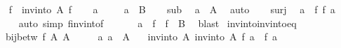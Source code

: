 \begin{isabellebody}
\ \ \isamarkupfalse%
\ {\isacharquery}{\kern0pt}f{\isacharprime}{\kern0pt}\ {\isacharequal}{\kern0pt}\ {\isachardoublequoteopen}inv{\isacharunderscore}{\kern0pt}into\ A\ f{\isachardoublequoteclose}\isanewline
\ \ \isamarkupfalse%
\ a{\isacharprime}{\kern0pt}\isanewline
\ \ \isamarkupfalse%
\ {\isacharasterisk}{\kern0pt}{\isacharcolon}{\kern0pt}\ {\isachardoublequoteopen}a{\isacharprime}{\kern0pt}\ {\isasymin}\ B{\isacharprime}{\kern0pt}{\isachardoublequoteclose}\isanewline
\ \ \isamarkupfalse%
\ sub\ \isamarkupfalse%
\ {\isachardoublequoteopen}a{\isacharprime}{\kern0pt}\ {\isasymin}\ A{\isacharprime}{\kern0pt}{\isachardoublequoteclose}\ \isamarkupfalse%
\ auto\isanewline
\ \ \isamarkupfalse%
\ surj\ \isamarkupfalse%
\ {\isachardoublequoteopen}a{\isacharprime}{\kern0pt}\ {\isacharequal}{\kern0pt}\ f\ {\isacharparenleft}{\kern0pt}{\isacharquery}{\kern0pt}f{\isacharprime}{\kern0pt}\ a{\isacharprime}{\kern0pt}{\isacharparenright}{\kern0pt}{\isachardoublequoteclose}\isanewline
\ \ \ \ \isamarkupfalse%
\ {\isacharparenleft}{\kern0pt}auto\ simp{\isacharcolon}{\kern0pt}\ f{\isacharunderscore}{\kern0pt}inv{\isacharunderscore}{\kern0pt}into{\isacharunderscore}{\kern0pt}f{\isacharparenright}{\kern0pt}\isanewline
\ \ \isamarkupfalse%
\ {\isacharasterisk}{\kern0pt}\ \isamarkupfalse%
\ {\isachardoublequoteopen}a{\isacharprime}{\kern0pt}\ {\isasymin}\ f\ {\isacharbackquote}{\kern0pt}\ {\isacharparenleft}{\kern0pt}{\isacharquery}{\kern0pt}f{\isacharprime}{\kern0pt}\ {\isacharbackquote}{\kern0pt}\ B{\isacharprime}{\kern0pt}{\isacharparenright}{\kern0pt}{\isachardoublequoteclose}\ \isamarkupfalse%
\ blast\isanewline
{}\isamarkupfalse%
%
\endisatagproof
{\isafoldproof}%
%
\isadelimproof
\isanewline
%
\endisadelimproof
\isanewline
{}\isamarkupfalse%
\ inv{\isacharunderscore}{\kern0pt}into{\isacharunderscore}{\kern0pt}inv{\isacharunderscore}{\kern0pt}into{\isacharunderscore}{\kern0pt}eq{\isacharcolon}{\kern0pt}\isanewline
\ \ \ {\isachardoublequoteopen}bij{\isacharunderscore}{\kern0pt}betw\ f\ A\ A{\isacharprime}{\kern0pt}{\isachardoublequoteclose}\isanewline
\ \ \ \ \ a{\isacharcolon}{\kern0pt}\ {\isachardoublequoteopen}a\ {\isasymin}\ A{\isachardoublequoteclose}\isanewline
\ \ \ {\isachardoublequoteopen}inv{\isacharunderscore}{\kern0pt}into\ A{\isacharprime}{\kern0pt}\ {\isacharparenleft}{\kern0pt}inv{\isacharunderscore}{\kern0pt}into\ A\ f{\isacharparenright}{\kern0pt}\ a\ {\isacharequal}{\kern0pt}\ f\ a{\isachardoublequoteclose}\isanewline

\end{isabellebody}
